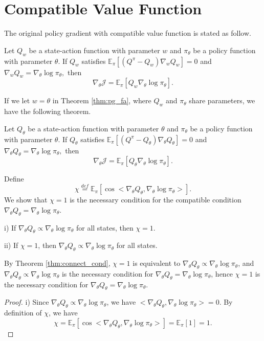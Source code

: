 
    

{ 
\section{Compatible Value Function}
\label{app:comp_v}

The original policy gradient with compatible value function is stated as follow. 
\begin{theorem}
Let $Q_w$ be a state-action function with parameter $w$ and $\pi_\theta$ be a policy function with parameter $\theta$. 
If $Q_w$ satisfies $\mathbb{E}_{\pi} [(Q^\pi - Q_w) \nabla_w Q_w] = 0$ and 
$\nabla_w Q_w = \nabla_\theta \log \pi_\theta,$
then $$\nabla_\theta \mathcal{J} = \mathbb{E}_\pi [Q_w \nabla_\theta \log \pi_\theta].$$
\label{thm:pg_fa}
\end{theorem}
If we let $w = \theta$ in Theorem \ref{thm:pg_fa}, where $Q_w$ and $\pi_\theta$ share parameters, we have the following theorem. 
\begin{theorem}
Let $Q_\theta$ be a state-action function with parameter $\theta$ and $\pi_\theta$ be a policy function with parameter $\theta$. 
If $Q_\theta$ satisfies $\mathbb{E}_{\pi} [(Q^\pi - Q_\theta) \nabla_\theta Q_\theta] = 0$ and 
$\nabla_\theta Q_\theta = \nabla_\theta \log \pi_\theta,$
then $$\nabla_\theta \mathcal{J} = \mathbb{E}_\pi [Q_\theta \nabla_\theta \log \pi_\theta].$$
\label{thm:pg_fa2}
\end{theorem}
Define 
$$\chi \overset{def}{=} \mathbb{E}_\pi [\cos <\nabla_\theta Q_\theta, \nabla_\theta \log \pi_\theta>].$$
We show that $\chi = 1$ is the necessary condition for the compatible condition $\nabla_\theta Q_\theta = \nabla_\theta \log \pi_\theta$. 
\begin{theorem}
i) If $\nabla_\theta Q_\theta \propto \nabla_\theta \log \pi_\theta$ for all states, then $\chi = 1$.

ii) If $\chi = 1$, then $\nabla_\theta Q_\theta \propto \nabla_\theta \log \pi_\theta$ for all states. 
\label{thm:connect_cond}
\end{theorem}
By Theorem \ref{thm:connect_cond}, $\chi = 1$ is equivalent to $\nabla_\theta Q_\theta \propto \nabla_\theta \log \pi_\theta$, and $\nabla_\theta Q_\theta \propto \nabla_\theta \log \pi_\theta$ is the necessary condition for $\nabla_\theta Q_\theta = \nabla_\theta \log \pi_\theta$, hence $\chi = 1$ is the necessary condition for $\nabla_\theta Q_\theta = \nabla_\theta \log \pi_\theta$.
\begin{proof}
i) Since $\nabla_\theta Q_\theta \propto \nabla_\theta \log \pi_\theta$, we have $<\nabla_\theta Q_\theta, \nabla_\theta \log \pi_\theta> = 0$. 
By definition of $\chi$, we have 
$$\chi = \mathbb{E}_\pi [\cos <\nabla_\theta Q_\theta, \nabla_\theta \log \pi_\theta>] = \mathbb{E}_\pi [1] = 1.$$


\end{proof}}
